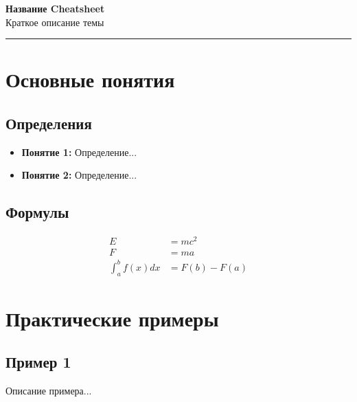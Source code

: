 \documentclass[10pt,landscape,a4paper]{article}
\begin{document}
\begin{center}
    {\Huge\bfseries Название Cheatsheet}\\[0.5cm]
    {\large Краткое описание темы}\\[0.3cm]
    \vspace{0.3cm}
    \rule{\textwidth}{1pt}
\end{center}

\providecommand{\contributors}{}
\newcommand{\contributorsDisplay}{%
  \if\relax\detokenize{\contributors}\relax
    ---
  \else
    \texttt{\contributors}
  \fi}

\begin{multicols}{2}

\section{Основные понятия}

\subsection{Определения}
\begin{itemize}
    \item \textbf{Понятие 1:} Определение...
    \item \textbf{Понятие 2:} Определение...
\end{itemize}

\subsection{Формулы}
\begin{align}
    E &= mc^2 \\
    F &= ma \\
    \int_a^b f(x) dx &= F(b) - F(a)
\end{align}

\section{Практические примеры}

\subsection{Пример 1}
Описание примера...


\end{multicols}
\end{document}
